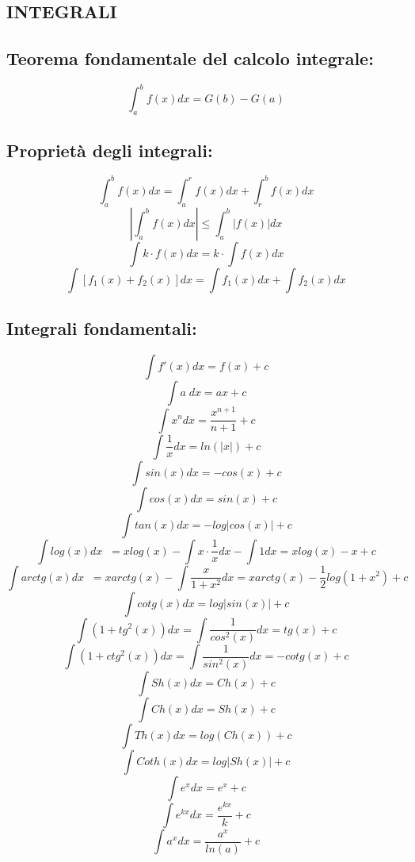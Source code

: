 \documentclass[a4paper, 9pt]{report}
\begin{document}
\subsection*{INTEGRALI}
\subsection*{Teorema fondamentale del calcolo integrale:}
\[
    \int_{a}^{b} f(x) dx = G(b) - G(a)
\]
\subsection*{Proprietà degli integrali:}
\[
    \int_{a}^{b} f(x)dx = \int_{a}^{r} f(x) dx + \int_{r}^{b} f(x) dx
\]
\[
    \left| \int_{a}^{b} f(x) dx \right| \leq \int_{a}^{b} |f(x)| dx
\]
\[
    \int k \cdot f(x) dx = k \cdot \int f(x) dx
\]
\[
    \int [f_1(x) + f_2(x) ] dx= \int f_1(x) dx + \int f_2(x) dx
\]
\subsection*{Integrali fondamentali:}
\[
    \int f'(x) dx = f(x) +c
\]
\[
    \int a \; dx = ax +c
\]
\[
    \int x^n dx = \frac{x^{n+1}}{n+1} +c
\]
\[
    \int \frac{1}{x}dx = ln(|x|) +c
\]
\[
    \int sin(x) dx = -cos(x) +c
\]
\[
    \int cos(x) dx = sin(x)+c
\]
\[
    \int tan(x) dx = -log|cos(x)| +c
\]
\[
    \int log(x) dx \;\; = xlog(x) - \int x \cdot  \frac{1}{x} dx - \int 1 dx = x log(x) -x + c
\]
\[
    \int arctg (x) dx \;\; = x arctg(x) -\int \frac{x}{1+x^2}dx = x arctg(x) -\frac{1}{2}log(1+x^2) + c 
\]
\[
    \int cotg(x) dx = log|sin(x)| +c
\]
\[
    \int (1+tg^2(x))dx = \int \frac{1}{cos^2(x)} dx = tg(x) +c
\]
\[
    \int (1+ctg^2(x))dx = \int \frac{1}{sin^2(x)} dx = -cotg(x) +c
\]
\[
    \int Sh(x) dx = Ch(x) +c
\]
\[
    \int Ch(x) dx = Sh(x) +c
\]
\[
    \int Th(x) dx = log(Ch(x))+c
\]
\[
    \int Coth(x) dx = log|Sh(x)| +c
\]
\[
    \int e^x dx = e^x+c
\]
\[
    \int e^{kx} dx = \frac{e^{kx}}{k} +c
\]
\[
    \int a^x dx = \frac{a^x}{ln(a)}+c
\]
\end{document}
